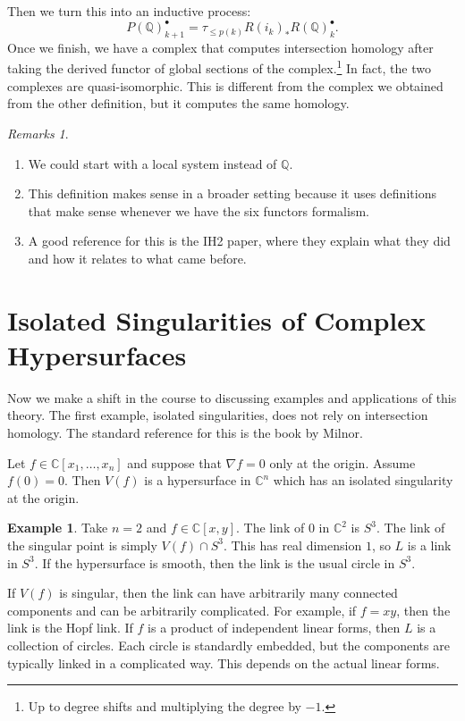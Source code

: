 \documentclass[leqno, openany]{memoir}
\theoremstyle{definition}
\newtheorem{exm}[thm]{Example}
\theoremstyle{remark}
\newtheorem{rmks}[thm]{Remarks}
\theoremstyle{plain}
\theoremstyle{definition}
\theoremstyle{remark}
\renewcommand{\C}{\mathbb{C}}
\newcommand{\Q}{\mathbb{Q}}
\begin{document}
Then we turn this into an inductive process:
\[ P(\Q)_{k+1}^{\bullet} = \tau_{\leq p(k)} R (i_k)_* R(\Q)_k^{\bullet}. \]
Once we finish, we have a complex that computes intersection homology after taking the derived functor of global sections of the complex.\footnote{Up to degree shifts and multiplying the degree by $-1$.} In fact, the two complexes are quasi-isomorphic. This is different from the complex we obtained from the other definition, but it computes the same homology.

\begin{rmks}
    \begin{enumerate}
        \item We could start with a local system instead of $\Q$.
        \item This definition makes sense in a broader setting because it uses definitions that make sense whenever we have the six functors formalism.
        \item A good reference for this is the IH2 paper, where they explain what they did and how it relates to what came before.
    \end{enumerate}
\end{rmks}

\section{Isolated Singularities of Complex Hypersurfaces}%
\label{sec:isolated_singularities_of_complex_hypersurfaces}

Now we make a shift in the course to discussing examples and applications of this theory. The first example, isolated singularities, does not rely on intersection homology. The standard reference for this is the book by Milnor.

Let $f \in \C[x_1, \ldots, x_n]$ and suppose that $\nabla f = 0$ only at the origin. Assume $f(0) = 0$. Then $V(f)$ is a hypersurface in $\C^n$ which has an isolated singularity at the origin.

\begin{exm}
    Take $n = 2$ and $f \in \C[x,y]$. The link of $0$ in $\C^2$ is $S^3$. The link of the singular point is simply $V(f) \cap S^3$. This has real dimension $1$, so $L$ is a link in $S^3$. If the hypersurface is smooth, then the link is the usual circle in $S^3$.

    If $V(f)$ is singular, then the link can have arbitrarily many connected components and can be arbitrarily complicated. For example, if $f = xy$, then the link is the Hopf link. If $f$ is a product of independent linear forms, then $L$ is a collection of circles. Each circle is standardly embedded, but the components are typically linked in a complicated way. This depends on the actual linear forms.
\end{exm}
\end{document}
